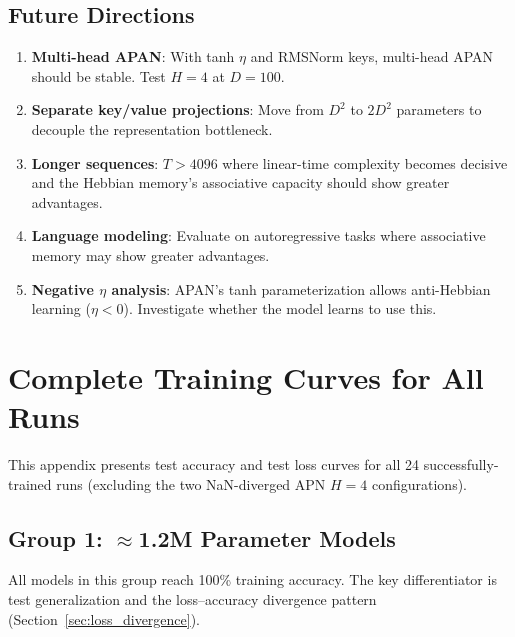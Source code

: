 \documentclass[11pt,a4paper]{article}
\begin{document}
\subsection{Future Directions}

\begin{enumerate}
\item \textbf{Multi-head APAN}: With tanh $\eta$ and RMSNorm keys, multi-head APAN should be stable. Test $H{=}4$ at $D{=}100$.
\item \textbf{Separate key/value projections}: Move from $D^2$ to $2D^2$ parameters to decouple the representation bottleneck.
\item \textbf{Longer sequences}: $T > 4096$ where linear-time complexity becomes decisive and the Hebbian memory's associative capacity should show greater advantages.
\item \textbf{Language modeling}: Evaluate on autoregressive tasks where associative memory may show greater advantages.
\item \textbf{Negative $\eta$ analysis}: APAN's tanh parameterization allows anti-Hebbian learning ($\eta < 0$). Investigate whether the model learns to use this.
\end{enumerate}

\clearpage
\appendix
\section{Complete Training Curves for All Runs}
\label{app:all_curves}

This appendix presents test accuracy and test loss curves for all 24 successfully-trained runs (excluding the two NaN-diverged APN $H{=}4$ configurations).

\subsection{Group 1: $\approx$1.2M Parameter Models}

All models in this group reach 100\% training accuracy. The key differentiator is test generalization and the loss--accuracy divergence pattern (Section~\ref{sec:loss_divergence}).
\end{document}
